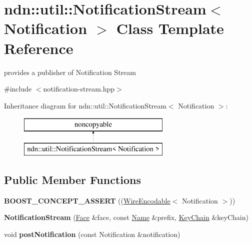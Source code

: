 \hypertarget{classndn_1_1util_1_1NotificationStream}{}\section{ndn\+:\+:util\+:\+:Notification\+Stream$<$ Notification $>$ Class Template Reference}
\label{classndn_1_1util_1_1NotificationStream}


provides a publisher of Notification Stream  




{\ttfamily \#include $<$notification-\/stream.\+hpp$>$}

Inheritance diagram for ndn\+:\+:util\+:\+:Notification\+Stream$<$ Notification $>$\+:\begin{figure}[H]
\begin{center}
\leavevmode
\includegraphics[height=2.000000cm]{classndn_1_1util_1_1NotificationStream}
\end{center}
\end{figure}
\subsection*{Public Member Functions}
\begin{DoxyCompactItemize}
\item 
{\bfseries B\+O\+O\+S\+T\+\_\+\+C\+O\+N\+C\+E\+P\+T\+\_\+\+A\+S\+S\+E\+RT} ((\hyperlink{classndn_1_1WireEncodable}{Wire\+Encodable}$<$ Notification $>$))\hypertarget{classndn_1_1util_1_1NotificationStream_a1133fda20d29cce7f4f29658208a1d91}{}\label{classndn_1_1util_1_1NotificationStream_a1133fda20d29cce7f4f29658208a1d91}

\item 
{\bfseries Notification\+Stream} (\hyperlink{classndn_1_1Face}{Face} \&face, const \hyperlink{classndn_1_1Name}{Name} \&prefix, \hyperlink{classndn_1_1security_1_1KeyChain}{Key\+Chain} \&key\+Chain)\hypertarget{classndn_1_1util_1_1NotificationStream_a5a70a917bc208206939233305f22384d}{}\label{classndn_1_1util_1_1NotificationStream_a5a70a917bc208206939233305f22384d}

\item 
void {\bfseries post\+Notification} (const Notification \&notification)\hypertarget{classndn_1_1util_1_1NotificationStream_ab1ca6f886a257302e688e64c7a4664fd}{}\label{classndn_1_1util_1_1NotificationStream_ab1ca6f886a257302e688e64c7a4664fd}

\end{DoxyCompactItemize}


